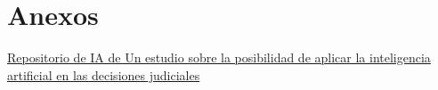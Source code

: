 \documentclass[runningheads]{llncs}
\begin{document}

\section{Anexos}
\href{https://github.com/EvelynJazminVelazquez/INTELIGENCIA-ARTIFICIAL-2024-2/blob/master/Un%20estudio%20sobre%20la%20posibilidad%20de%20aplicar%20la%20inteligencia%20artificial%20en%20las%20decisiones%20judiciales.zip}{Repositorio de IA de Un estudio sobre la posibilidad de aplicar la inteligencia artificial en las decisiones judiciales}
\end{document}
